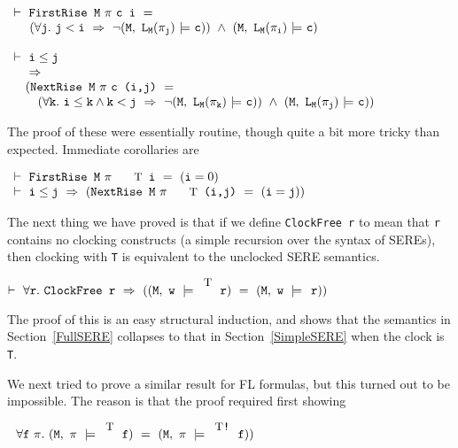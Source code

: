 \documentclass{llncs}
\newcommand{\T}{\texttt{\small\rm{T}}}
\newcommand{\bSem}[3]{(\tt#1,~#2~{\models}~#3)}
\newcommand{\sSem}[4]{(\tt{#1,~#2~\models^{\hspace*{-2.3mm}\raisebox{1mm}{\tt#3}}~#4})}
\renewcommand{\c}{{\hspace*{2.5mm}}}
\newcommand{\fSem}[4]{(\tt{#1,~#2~\models^{\hspace*{-2.3mm}\raisebox{1mm}{\tt#3}}~#4})}
\renewcommand{\t}[1]{\texttt{#1}}
\begin{document}
$\begin{array}{l}
\vdash~ \t{FirstRise~M}~{\pi}~\t{c~i}~=\\
\phantom{\vdash~}
~(\forall \t{j}.~\t{j} < \t{i} ~\Rightarrow~\neg\bSem{M}{L_{M}(\pi_j)}{\t{c}})~\wedge~\bSem{M}{L_{M}(\pi_i)}{\t{c}}\\
 \\
\vdash~ \t{i}\leq \t{j}\\
\phantom{\vdash~}
\Rightarrow\\
\phantom{\vdash~}
(\t{NextRise~M}~{\pi}~\t{c~(i,j)}~=\\
\phantom{\vdash~(}
~(\forall \t{k}.~\t{i} \leq \t{k} \wedge \t{k} < \t{j} ~\Rightarrow~\neg\bSem{M}{L_{M}(\pi_k)}{\t{c}})~\wedge~\bSem{M}{L_{M}(\pi_j)}{\t{c}})
\end{array}$

\medskip

The proof of these were essentially routine, though quite a bit more tricky than expected. Immediate corollaries are


\medskip

$\begin{array}{l}
\vdash~ \t{FirstRise~M}~{\pi}~\t{\T~i}~=~(\t{i}=0)
 \\
\vdash~ \t{i}\leq \t{j}~\Rightarrow~(\t{NextRise~M}~{\pi}~\t{\T~(i,j)}~=~(\t{i} = \t{j}))
\end{array}$

\medskip


The next thing we have proved is that if we define \t{ClockFree~r} to mean
that \t{r} contains no clocking constructs (a simple recursion over the syntax of SEREs),
then clocking with \T{} is equivalent to the unclocked SERE semantics.

\medskip

$\vdash~\forall{\t{r}}.~\t{ClockFree~r}~\Rightarrow~(\sSem{M}{w}{\T}{r}~=~\sSem{M}{w}{\c}{r})$

\medskip

The proof of this is an easy structural induction, and shows that the semantics in Section~\ref{FullSERE}
collapses to that in Section~\ref{SimpleSERE} when the clock is \T.

We next tried to prove a similar result for FL formulas, but this turned out to be impossible.
The reason is that the proof required first showing


\medskip

$~~\forall{\t{f}}~\pi.~\fSem{M}{\pi}{\T}{f}~=~\sSem{M}{\pi}{\T\texttt{!}}{f})$

\medskip
\end{document}
